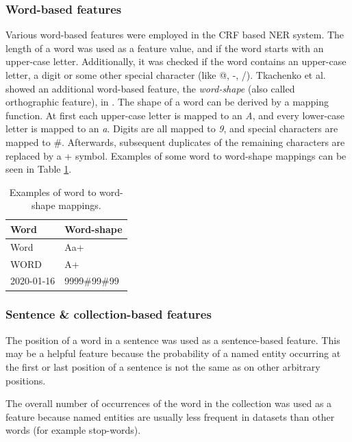 \documentclass[12pt]{book}
\begin{document}
	\subsubsection{Word-based features}
	
	Various word-based features were employed in the CRF based NER system. The length of a word was used as a feature value, and if the word starts with an upper-case letter. Additionally, it was checked if the word contains an upper-case letter, a digit or some other special character (like @, -, /). Tkachenko et al. showed an additional word-based feature, the \textit{word-shape} (also called orthographic feature), in \cite{tkachenko2012named}. The shape of a word can be derived by a mapping function. At first each upper-case letter is mapped to an \textit{A}, and every lower-case letter is mapped to an \textit{a}. Digits are all mapped to \textit{9}, and special characters are mapped to \#. Afterwards, subsequent duplicates of the remaining characters are replaced by a + symbol. Examples of some word to word-shape mappings can be seen in Table \ref{tab:wordshape}.
	
	\begin{center}
		\begin{table}[H]
			\centering
			\begin{tabular}{l | l}
				Word & Word-shape \\
				\hline
				Word & Aa+ \\
				WORD & A+ \\
				2020-01-16 & 9999\#99\#99			
			\end{tabular}
			\caption{Examples of word to word-shape mappings.}
			\label{tab:wordshape}
		\end{table}
	\end{center}

	\subsubsection{Sentence \& collection-based features}	
	
	The position of a word in a sentence was used as a sentence-based feature. This may be a helpful feature because the probability of a named entity occurring at the first or last position of a sentence is not the same as on other arbitrary positions.
	
	The overall number of occurrences of the word in the collection was used as a feature because named entities are usually less frequent in datasets than other words (for example stop-words).
	
\end{document}
